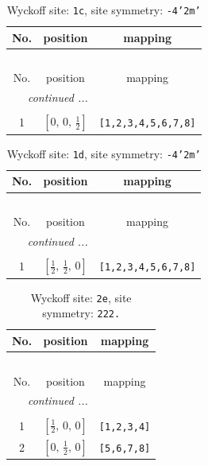 \documentclass[fleqn,8pt]{jsarticle}
\begin{document}
\begin{longtable}{ccc}
\caption{Wyckoff site: {\tt 1c}, site symmetry: {\tt -4'2m'}}
 \\
 \hline \hline
No. & position & mapping \\ \hline \endfirsthead

\multicolumn{2}{l}{\tablename\ \thetable{}} \\
 \hline \hline
No. & position & mapping \\ \hline \endhead

 \hline \hline
\multicolumn{2}{r}{\footnotesize\it continued ...} \\ \endfoot

 \hline \hline
\multicolumn{2}{r}{} \\ \endlastfoot

1 & $\left[ 0,\, 0,\, \frac{1}{2} \right]$ & {\tt [1,2,3,4,5,6,7,8]} \\
\end{longtable}
\renewcommand{\arraystretch}{1.2}
\begin{longtable}{ccc}
\caption{Wyckoff site: {\tt 1d}, site symmetry: {\tt -4'2m'}}
 \\
 \hline \hline
No. & position & mapping \\ \hline \endfirsthead

\multicolumn{2}{l}{\tablename\ \thetable{}} \\
 \hline \hline
No. & position & mapping \\ \hline \endhead

 \hline \hline
\multicolumn{2}{r}{\footnotesize\it continued ...} \\ \endfoot

 \hline \hline
\multicolumn{2}{r}{} \\ \endlastfoot

1 & $\left[ \frac{1}{2},\, \frac{1}{2},\, 0 \right]$ & {\tt [1,2,3,4,5,6,7,8]} \\
\end{longtable}
\renewcommand{\arraystretch}{1.2}
\begin{longtable}{ccc}
\caption{Wyckoff site: {\tt 2e}, site symmetry: {\tt 222.}}
 \\
 \hline \hline
No. & position & mapping \\ \hline \endfirsthead

\multicolumn{2}{l}{\tablename\ \thetable{}} \\
 \hline \hline
No. & position & mapping \\ \hline \endhead

 \hline \hline
\multicolumn{2}{r}{\footnotesize\it continued ...} \\ \endfoot

 \hline \hline
\multicolumn{2}{r}{} \\ \endlastfoot

1 & $\left[ \frac{1}{2},\, 0,\, 0 \right]$ & {\tt [1,2,3,4]} \\ \hline
2 & $\left[ 0,\, \frac{1}{2},\, 0 \right]$ & {\tt [5,6,7,8]} \\
\end{longtable}
\end{document}

